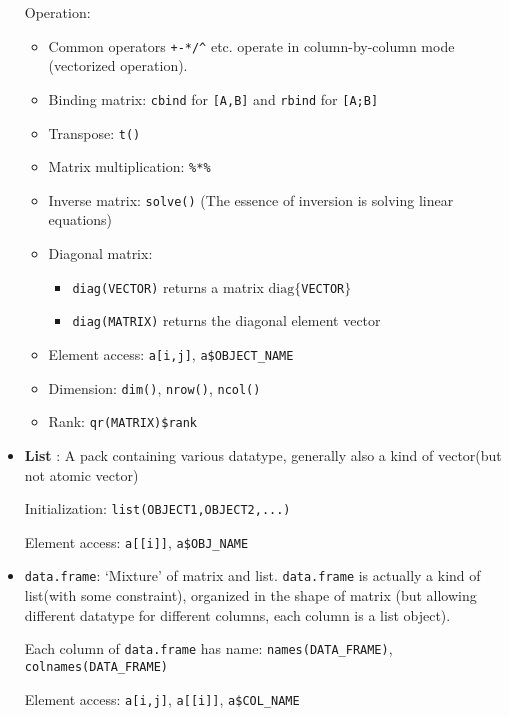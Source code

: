\begin{itemize}[topsep=2pt,itemsep=0pt]
    Operation:
    \begin{itemize}[topsep=2pt,itemsep=0pt]
        \item Common operators \lstinline|+-*/^| etc. operate in column-by-column mode (vectorized operation).
        \item Binding matrix: \lstinline|cbind| for \lstinline|[A,B]| and \lstinline|rbind| for \lstinline|[A;B]|
        \item Transpose: \lstinline|t()|
        \item Matrix multiplication: \lstinline|%*%|
        \item Inverse matrix: \lstinline|solve()| (The essence of inversion is solving linear equations)
        \item Diagonal matrix:
        \begin{itemize}[topsep=2pt,itemsep=0pt]
            \item \lstinline|diag(VECTOR)| returns a matrix $ \mathrm{diag}\{ $\lstinline|VECTOR|$ \} $
            \item \lstinline|diag(MATRIX)| returns the diagonal element vector
        \end{itemize}
        \item Element access: \lstinline|a[i,j]|, \lstinline|a$OBJECT_NAME|
        \item Dimension: \lstinline|dim()|, \lstinline|nrow()|, \lstinline|ncol()|
        \item Rank: \lstinline|qr(MATRIX)$rank|
    \end{itemize}
    
    \item \textbf{List} : A pack containing various datatype, generally also a kind of vector(but not atomic vector)
    
    Initialization: \lstinline|list(OBJECT1,OBJECT2,...)|

    Element access: \lstinline|a[[i]]|, \lstinline|a$OBJ_NAME|
    \item \lstinline|data.frame|: `Mixture' of matrix and list. \lstinline|data.frame| is actually a kind of list(with some constraint), organized in the shape of matrix (but allowing different datatype for different columns, each column is a list object).
    
    Each column of \lstinline|data.frame| has name: \lstinline|names(DATA_FRAME)|, \lstinline|colnames(DATA_FRAME)|

    Element access: \lstinline|a[i,j]|, \lstinline|a[[i]]|, \lstinline|a$COL_NAME|
\end{itemize}

